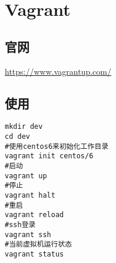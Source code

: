\chapter{Vagrant}

\section{官网}
\url{https://www.vagrantup.com/}

\section{使用}
\begin{lstlisting}
mkdir dev
cd dev
#使用centos6来初始化工作目录
vagrant init centos/6
#启动
vagrant up
#停止
vagrant halt
#重启
vagrant reload
#ssh登录
vagrant ssh
#当前虚拟机运行状态
vagrant status
\end{lstlisting} 